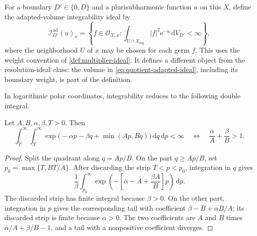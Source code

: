 For a boundary $D'\in\{0,D\}$ and a plurisubharmonic function $u$ on this $X$, define the adapted-volume integrability ideal by
\begin{equation}\label{eq:quotient-adapted-ideal}
 \mathcal I_{D'}^{\mathrm{ad}}(u)_x
 =\left\{f\in\mathcal O_{X,x}:
   \int_{U\cap X_{\mathrm{reg}}}|f|^2\mathrm{e}^{-u}\,\mathrm{d}V_{D'}<\infty\right\},
\end{equation}
where the neighborhood $U$ of $x$ may be chosen for each germ $f$. This uses the weight convention of \cref{def:multiplier-ideal}. It defines a different object from the resolution-ideal class: the volume in \eqref{eq:quotient-adapted-ideal}, including its boundary weight, is part of the definition.

In logarithmic polar coordinates, integrability reduces to the following double integral.

\begin{lemma}\label{lem:weighted-logarithmic-maximum-integral}
Let $A,B,\alpha,\beta,T>0$. Then
\[
 \int_T^\infty\int_T^\infty
  \exp\bigl(-\alpha p-\beta q+\min(Ap,Bq)\bigr)
       \,\mathrm{d}q\,\mathrm{d}p<\infty
 \quad\Longleftrightarrow\quad
 \frac\alpha A+\frac\beta B>1.
\]
\end{lemma}
\begin{proof}
Split the quadrant along $q=Ap/B$. On the part $q\geq Ap/B$, set $p_0=\max\{T,BT/A\}$. After discarding the strip $T<p<p_0$, integration in $q$ gives
\[
 \frac1\beta
 \int_{p_0}^\infty
   \exp\left(-\left[\alpha-A+\frac{\beta A}{B}\right]p\right)
      \,\mathrm{d}p.
\]
The discarded strip has finite integral because $\beta>0$. On the other part, integration in $p$ gives the corresponding tail with coefficient $\beta-B+\alpha B/A$; its discarded strip is finite because $\alpha>0$. The two coefficients are $A$ and $B$ times $\alpha/A+\beta/B-1$, and a tail with a nonpositive coefficient diverges.
\end{proof}

